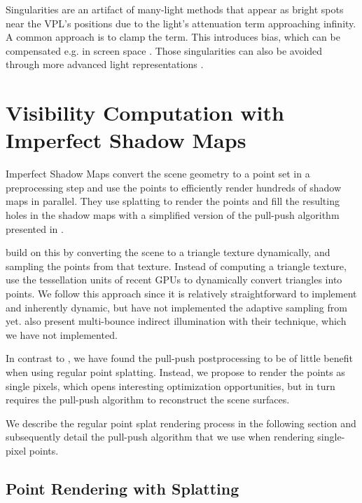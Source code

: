 Singularities are an artifact of many-light methods that appear as bright spots near the VPL's positions due to the light's attenuation term approaching infinity. A common approach is to clamp the term. This introduces bias, which can be compensated e.g. in screen space \cite{novak2011screen}. Those singularities can also be avoided through more advanced light representations \cite{tokuyoshi2015vsgl}.



\section{Visibility Computation with \\ Imperfect Shadow Maps}
\label{sec:concept:ism}

Imperfect Shadow Maps \cite{ritschel2008ism} convert the scene geometry to a point set in a preprocessing step and use the points to efficiently render hundreds of shadow maps in parallel. They use splatting to render the points and fill the resulting holes in the shadow maps with a simplified version of the pull-push algorithm presented in \cite{Marroquim:2007:reconstruction}.

\cite{ritschel2011ismsViewAdaptive} build on this by converting the scene to a triangle texture dynamically, and sampling the points from that texture. Instead of computing a triangle texture, \cite{barak2013temporally} use the tessellation units of recent GPUs to dynamically convert triangles into points.
We follow this approach since it is relatively straightforward to implement and inherently dynamic, but have not implemented the adaptive sampling from \cite{ritschel2011ismsViewAdaptive} yet.
\cite{ritschel2008ism} also present multi-bounce indirect illumination with their technique, which we have not implemented.

In contrast to \cite{ritschel2008ism}, we have found the pull-push postprocessing to be of little benefit when using regular point splatting. Instead, we propose to render the points as single pixels, which opens interesting optimization opportunities, but in turn requires the pull-push algorithm to reconstruct the scene surfaces.

We describe the regular point splat rendering process in the following section and subsequently detail the pull-push algorithm that we use when rendering single-pixel points.


\subsection{Point Rendering with Splatting}

